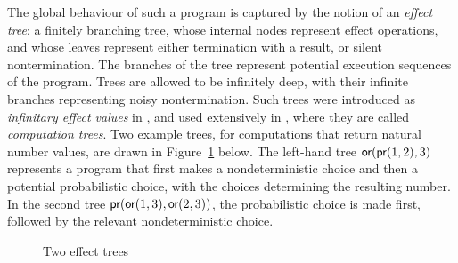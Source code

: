 The global behaviour of such a program is captured by the notion of an \emph{effect tree}: a  finitely branching tree, whose 
internal nodes represent effect operations, and whose leaves represent either termination with a result, or silent nontermination. The branches of the tree represent potential execution sequences of the program. 
Trees are allowed to be infinitely deep, with their infinite branches representing noisy nontermination.
Such trees were introduced as \emph{infinitary effect values} in  \cite{plotkin2001adequacy}, and used extensively in \cite{gom}, where they are called
\emph{computation trees}. Two example trees, for computations that return natural number values, are drawn in
Figure~\ref{fig:exampletrees} below. The left-hand tree $\operatorname{\textsf{or}} (\operatorname{\textsf{pr}} (1,2), 3)$ represents a program that first makes a nondeterministic choice and then a potential probabilistic choice, with the choices determining the resulting number. In the second tree $\operatorname{\textsf{pr}} (\operatorname{\textsf{or}} (1,3), \operatorname{\textsf{or}} (2,3))$, the probabilistic choice is made first, followed by the relevant nondeterministic choice.

\begin{figure}[h]
\small
    \begin{center}
        \hspace*{8ex}
    \end{center}
    \caption{Two effect trees}
    \label{fig:exampletrees}
\end{figure}






